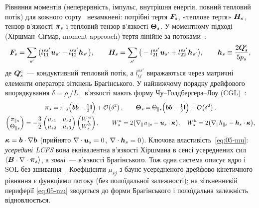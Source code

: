 Рівняння моментів (неперервність, імпульс, внутрішня енергія, повний тепловий потік) для кожного сорту~\cite[с.~3, (8)--(11)]{Seto2014} незамкнені: потрібні тертя $\bm{F}_s$, «теплове тертя» $\bm{H}_s$, тензор в'язкості $\bm{\mathsf{\pi}}_s$ і тепловий тензор в'язкості $\bm{\Theta}_s$. У моментному підході (Хіршман--Сігмар, moment approach) тертя лінійне за потоками~\cite[с.~4, (22)--(23)]{Seto2014}:
\begin{equation}\label{eq:05-fric}
  \bm{F}_s=\sum_{s'}\big(l_{11}^{ss'}\bm{u}_{s'}-l_{12}^{ss'}\bm{h}_{s'}\big),\qquad
  \bm{H}_s=\sum_{s'}\big(-l_{21}^{ss'}\bm{u}_{s'}+l_{22}^{ss'}\bm{h}_{s'}\big),\qquad \bm{h}_s\equiv\frac{2\bm{Q}^{\mathrm c}_s}{5p_s},
\end{equation}
де $\bm{Q}^{\mathrm c}_s$~--- кондуктивний тепловий потік, а $l^{ss'}_{ij}$ виражаються через матричні елементи оператора зіткнень Брагінського. У найнижчому порядку дрейфового впорядкування $\delta=\rho_i/L_\perp$ в'язкості мають форму Чу--Голдбергера--Лоу (CGL)~\cite[с.~4, (24)--(28)]{Seto2014}:
\begin{gather}
  \bm{\mathsf{\pi}}_s=\pi_{\parallel s}\Big(\bm{b}\bm{b}-\tfrac13\bm{\mathsf{I}}\Big)+\mathcal{O}\!\left(\delta^2\right),\qquad
  \bm{\Theta}_s=\Theta_{\parallel s}\Big(\bm{b}\bm{b}-\tfrac13\bm{\mathsf{I}}\Big)+\mathcal{O}\!\left(\delta^2\right),\label{eq:05-cgl}\\
  \begin{pmatrix}\pi_{\parallel s}\\ \Theta_{\parallel s}\end{pmatrix}=-\frac32
  \begin{pmatrix}\mu_{s1}&\mu_{s2}\\ \mu_{s2}&\mu_{s3}\end{pmatrix}
  \begin{pmatrix}W^{u}_{s}\\ W^{h}_{s}\end{pmatrix},\qquad
  W^{u}_s=2\big(\nabla_\parallel u_{\parallel s}-\bm{u}_s\cdot\bm{\kappa}\big),\quad
  W^{h}_s=2\big(\nabla_\parallel h_{\parallel s}-\bm{h}_s\cdot\bm{\kappa}\big),\label{eq:05-mu}
\end{gather}
$\bm{\kappa}=\bm{b}\cdot\nabla\bm{b}$ (прийнято $\nabla\cdot\bm{u}_s=0$, $\nabla\cdot\bm{h}_s=0$). Ключова властивість~\eqref{eq:05-mu}: \emph{усередині LCFS} вона еквівалентна в'язкості Хіршмана в сенсі усереднених сил $\left\langle \bm{B}\cdot\nabla\cdot\bm{\mathsf{\pi}}_s \right\rangle$, а \emph{зовні}~--- в'язкості Брагінського. Тож одна система описує ядро і SOL без зшивання~\cite[с.~4]{Seto2014}. Коефіцієнти $\mu_{sj}$ з баунс-усередненого дрейфово-кінетичного рівняння є функціями потоку (без полоїдальної залежності); на зіткненнєвій периферії \eqref{eq:05-mu} зводиться до форми Брагінського і полоїдальна залежність відновлюється.

